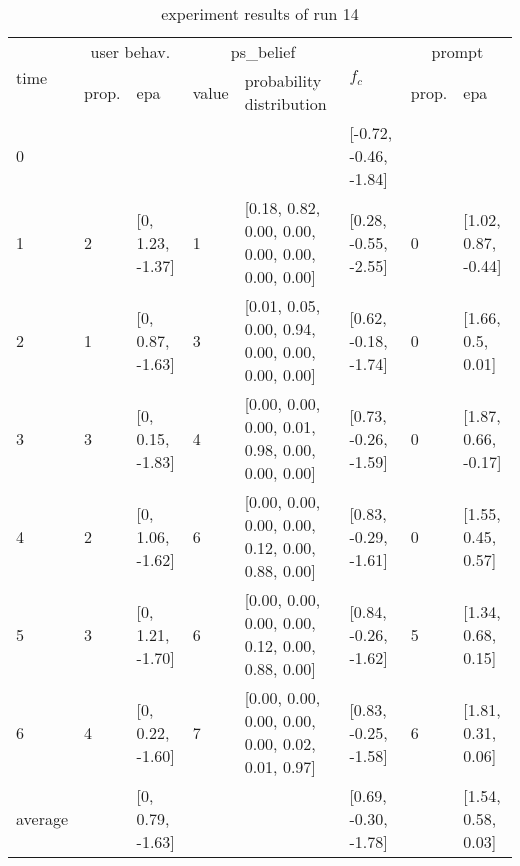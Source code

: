 

\begin{table}[htbp]\footnotesize
\caption{experiment results of run 14}
\begin{center}
\begin{tabular}{|p{0.4cm}|p{0.6cm}|l|p{0.6cm}|p{3.3cm}|l|p{0.6cm}|l|}
\hline

\multirow{2}{*}{time} & \multicolumn{2}{c|}{user behav.} & \multicolumn{2}{c|}{ps\_belief} &
\multirow{2}{*}{$f_c$} & \multicolumn{2}{c|}{prompt} \\ \cline{2-5}\cline{ 7- 8}
& prop. & epa & value & probability distribution &  & prop. & epa \\ \hline

0 & \multicolumn{1}{l|}{} &  & \multicolumn{1}{l|}{} &  & [-0.72, -0.46, -1.84] & \multicolumn{1}{l|}{} &  \\ \hline
1 & 2 & [0, 1.23, -1.37] & 1 & [0.18, 0.82, 0.00, 0.00, 0.00, 0.00, 0.00, 0.00] & [0.28, -0.55, -2.55] & 0 & [1.02, 0.87, -0.44] \\ \hline
2 & 1 & [0, 0.87, -1.63] & 3 & [0.01, 0.05, 0.00, 0.94, 0.00, 0.00, 0.00, 0.00] & [0.62, -0.18, -1.74] & 0 & [1.66, 0.5, 0.01] \\ \hline
3 & 3 & [0, 0.15, -1.83] & 4 & [0.00, 0.00, 0.00, 0.01, 0.98, 0.00, 0.00, 0.00] & [0.73, -0.26, -1.59] & 0 & [1.87, 0.66, -0.17] \\ \hline
4 & 2 & [0, 1.06, -1.62] & 6 & [0.00, 0.00, 0.00, 0.00, 0.12, 0.00, 0.88, 0.00] & [0.83, -0.29, -1.61] & 0 & [1.55, 0.45, 0.57] \\ \hline
5 & 3 & [0, 1.21, -1.70] & 6 & [0.00, 0.00, 0.00, 0.00, 0.12, 0.00, 0.88, 0.00] & [0.84, -0.26, -1.62] & 5 & [1.34, 0.68, 0.15] \\ \hline
6 & 4 & [0, 0.22, -1.60] & 7 & [0.00, 0.00, 0.00, 0.00, 0.00, 0.02, 0.01, 0.97] & [0.83, -0.25, -1.58] & 6 & [1.81, 0.31, 0.06] \\ \hline
\multicolumn{1}{|l|}{average} & \multicolumn{1}{l|}{} & [0, 0.79, -1.63] & \multicolumn{1}{l|}{} &  & [0.69, -0.30, -1.78] & \multicolumn{1}{l|}{} & [1.54, 0.58, 0.03] \\ \hline
\end{tabular}
\end{center}
\label{}
\end{table}


